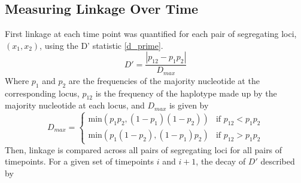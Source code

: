 \documentclass[12pt]{article}
\begin{document}
\subsection*{Measuring Linkage Over Time}

First linkage at each time point was quantified for each pair of segregating loci, $(x_1, x_2)$, using the D’ statistic \eqref{d_prime}. 
 \begin{equation}\label{d_prime}
 D' = \frac{|p_{12} - p_1p_2|}{D_{max}}
 \end{equation}
     Where $p_1$ and $p_2$ are the frequencies of the majority nucleotide at the corresponding locus, $p_{12}$ is the frequency of the haplotype made up by the majority nucleotide at each locus, and $D_{max}$ is given by
\[
    D_{max} = \begin{cases}
    \text{min}(p_1p_2, (1-p_1)(1-p_2)) & \text{if }p_{12} < p_1p_2\\
    \text{min}(p_1(1-p_2), (1-p_1)p_2) & \text{if }p_{12} > p_1p_2
    \end{cases}
\]
Then, linkage is compared across all pairs of segregating loci for all pairs of timepoints. For a given set of timepoints $i$ and $i+1$, the decay of $D'$ described by
\end{document}
